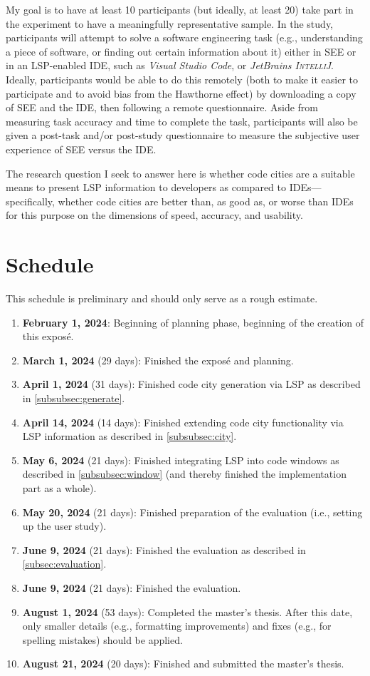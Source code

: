\documentclass{scrartcl}
\newcommand{\SEE}{\textsc{SEE}}
\begin{document}
{My goal is to have at least 10 participants (but ideally, at least 20) take part in the experiment to have a meaningfully representative sample.
In the study, participants will attempt to solve a software engineering task (e.g., understanding a piece of software, or finding out certain information about it) either in \SEE{} or in an LSP-enabled IDE, such as \textit{Visual Studio Code}, or \textit{JetBrains \textsc{IntelliJ}}.
Ideally, participants would be able to do this remotely (both to make it easier to participate and to avoid bias from the Hawthorne effect) by downloading a copy of \SEE{} and the IDE, then following a remote questionnaire.
Aside from measuring task accuracy and time to complete the task, participants will also be given a post-task and/or post-study questionnaire to measure the subjective user experience of \SEE{} versus the IDE.

The research question I seek to answer here is whether code cities are a suitable means to present LSP information to developers as compared to IDEs---specifically, whether code cities are better than, as good as, or worse than IDEs for this purpose on the dimensions of speed, accuracy, and usability.

\section{Schedule}
This schedule is preliminary and should only serve as a rough estimate.
\begin{enumerate}
    \item \textbf{February 1, 2024}: Beginning of planning phase, beginning of the creation of this exposé.
    \item \textbf{March 1, 2024} (29 days): Finished the exposé and planning.
    \item \textbf{April 1, 2024} (31 days): Finished code city generation via LSP as described in \autoref{subsubsec:generate}.
    \item \textbf{April 14, 2024} (14 days): Finished extending code city functionality via LSP information as described in \autoref{subsubsec:city}.
    \item \textbf{May 6, 2024} (21 days): Finished integrating LSP into code windows as described in \autoref{subsubsec:window} (and thereby finished the implementation part as a whole).
    \item \textbf{May 20, 2024} (21 days): Finished preparation of the evaluation (i.e., setting up the user study).
    \item \textbf{June 9, 2024} (21 days): Finished the evaluation as described in \autoref{subsec:evaluation}.
    \item \textbf{June 9, 2024} (21 days): Finished the evaluation.
    \item \textbf{August 1, 2024} (53 days): Completed the master's thesis.
      After this date, only smaller details (e.g., formatting improvements) and fixes (e.g., for spelling mistakes) should be applied.
    \item \textbf{August 21, 2024} (20 days): Finished and submitted the master's thesis.
\end{enumerate}

}
\end{document}
